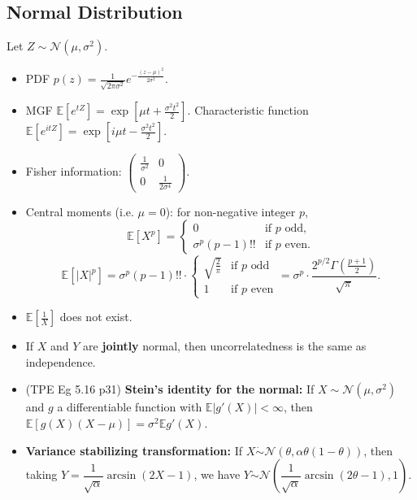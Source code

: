 \documentclass[twoside]{article}
\newcommand\bbE{\mathbb{E}}
\newcommand\calN{\mathcal{N}}
\newcommand\sg{\sigma}
\def\t{\theta}
\begin{document}
\subsection{Normal Distribution}
Let $Z \sim \calN(\mu, \sg^2)$.
\begin{itemize}
\item PDF $p(z) = \displaystyle\frac{1}{\sqrt{2\pi \sg^2}} e^{-\frac{(z-\mu)^2}{2\sg^2}}$.

\item MGF $\bbE \left[ e^{tZ} \right] = \exp \left[ \mu t + \frac{\sg^2 t^2}{2} \right]$. Characteristic function $\bbE \left[ e^{itZ} \right] = \exp \left[ i\mu t - \frac{\sg^2 t^2}{2} \right]$.

\item Fisher information: $\begin{pmatrix} \frac{1}{\sg^2} & 0 \\ 0 & \frac{1}{2\sg^4}  \end{pmatrix}$.

\item Central moments (i.e. $\mu = 0$): for non-negative integer $p$,
\begin{equation*}
\bbE [X^p] = \begin{cases} 0 &\text{if $p$ odd,} \\ \sg^p (p-1)!! &\text{if $p$ even.} \end{cases}
\end{equation*}
\begin{equation*}
\bbE [|X|^p] = \sg^p (p-1)!! \cdot \begin{cases} \sqrt{\frac{2}{\pi}} &\text{if $p$ odd} \\ 1 &\text{if $p$ even} \end{cases} = \sg^p \cdot \frac{2^{p/2} \Gamma \left( \frac{p+1}{2} \right)}{\sqrt{\pi}}.
\end{equation*}

\item $\bbE \left[ \frac{1}{X}\right]$ does not exist.

\item If $X$ and $Y$ are \textbf{jointly} normal, then uncorrelatedness is the same as independence.

\item (TPE Eg 5.16 p31) \textbf{Stein's identity for the normal:} If $X \sim \calN(\mu, \sg^2)$ and $g$ a differentiable function with $\bbE |g'(X)| < \infty$, then $\bbE [g(X) (X-\mu)] = \sg^2 \bbE g'(X)$.

\item \textbf{Variance stabilizing transformation:} If $X \dot{\sim} \calN(\t, \alpha \t(1-\t))$, then taking $Y = \dfrac{1}{\sqrt{\alpha}}\arcsin (2X - 1)$, we have $Y \dot{\sim} \calN \left(\dfrac{1}{\sqrt{\alpha}}\arcsin(2\t - 1), 1 \right)$.


\end{itemize}
\end{document}
